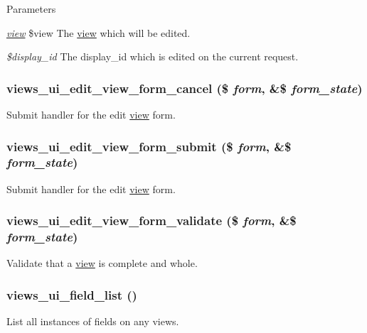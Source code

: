 \begin{DoxyParams}{Parameters}
\item[{\em \hyperlink{classview}{view}}]\$view The \hyperlink{classview}{view} which will be edited. \item[{\em \$display\_\-id}]The display\_\-id which is edited on the current request. \end{DoxyParams}
\hypertarget{admin_8inc_ac138be787565f55b939741a65574a8ea}{
\subsubsection[{views\_\-ui\_\-edit\_\-view\_\-form\_\-cancel}]{\setlength{\rightskip}{0pt plus 5cm}views\_\-ui\_\-edit\_\-view\_\-form\_\-cancel (\$ {\em form}, \/  \&\$ {\em form\_\-state})}}
\label{admin_8inc_ac138be787565f55b939741a65574a8ea}
Submit handler for the edit \hyperlink{classview}{view} form. \hypertarget{admin_8inc_a1175fee9669154b7486a7e2fbfc6efae}{
\subsubsection[{views\_\-ui\_\-edit\_\-view\_\-form\_\-submit}]{\setlength{\rightskip}{0pt plus 5cm}views\_\-ui\_\-edit\_\-view\_\-form\_\-submit (\$ {\em form}, \/  \&\$ {\em form\_\-state})}}
\label{admin_8inc_a1175fee9669154b7486a7e2fbfc6efae}
Submit handler for the edit \hyperlink{classview}{view} form. \hypertarget{admin_8inc_a64c87654d6ff972d3755b11283257766}{
\subsubsection[{views\_\-ui\_\-edit\_\-view\_\-form\_\-validate}]{\setlength{\rightskip}{0pt plus 5cm}views\_\-ui\_\-edit\_\-view\_\-form\_\-validate (\$ {\em form}, \/  \&\$ {\em form\_\-state})}}
\label{admin_8inc_a64c87654d6ff972d3755b11283257766}
Validate that a \hyperlink{classview}{view} is complete and whole. \hypertarget{admin_8inc_a4e024c95c4341af36a85972510cd570e}{
\subsubsection[{views\_\-ui\_\-field\_\-list}]{\setlength{\rightskip}{0pt plus 5cm}views\_\-ui\_\-field\_\-list ()}}
\label{admin_8inc_a4e024c95c4341af36a85972510cd570e}
List all instances of fields on any views.

